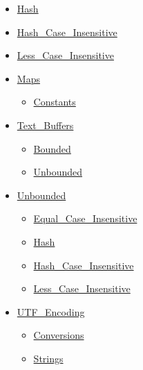 \begin{scriptsize}
\begin{multicols*}{\columnnr}
\begin{itemize}[leftmargin=0mm]
\begin{itemize}[leftmargin=5mm]
\begin{itemize}[leftmargin=5mm]
\begin{itemize}[leftmargin=5mm]
	  \end{itemize}
	\item[] \href{http://www.ada-auth.org/standards/22rm/html/RM-A-4-9.html}{Hash}
	\item[] \href{http://www.ada-auth.org/standards/22rm/html/RM-A-4-9.html}{Hash\_Case\_Insensitive}
	\item[] \href{http://www.ada-auth.org/standards/22rm/html/RM-A-4-10.html}{Less\_Case\_Insensitive}
	\item[] \href{http://www.ada-auth.org/standards/22rm/html/RM-A-4-2.html}{Maps}
	  \begin{itemize}[leftmargin=5mm]
	  \item[] \href{http://www.ada-auth.org/standards/22rm/html/RM-A-4-6.html}{Constants}
	  \end{itemize}
	\item[] \href{http://www.ada-auth.org/standards/22rm/html/RM-A-4-12.html}{Text\_Buffers}
	  \begin{itemize}[leftmargin=5mm]
	  \item[] \href{http://www.ada-auth.org/standards/22rm/html/RM-A-4-12.html}{Bounded}
	  \item[] \href{http://www.ada-auth.org/standards/22rm/html/RM-A-4-12.html}{Unbounded}
	  \end{itemize}
	\item[] \href{http://www.ada-auth.org/standards/22rm/html/RM-A-4-5.html}{Unbounded}
	  \begin{itemize}[leftmargin=5mm]
	  \item[] \href{http://www.ada-auth.org/standards/22rm/html/RM-A-4-10.html}{Equal\_Case\_Insensitive}
	  \item[] \href{http://www.ada-auth.org/standards/22rm/html/RM-A-4-9.html}{Hash}
	  \item[] \href{http://www.ada-auth.org/standards/22rm/html/RM-A-4-9.html}{Hash\_Case\_Insensitive}
	  \item[] \href{http://www.ada-auth.org/standards/22rm/html/RM-A-4-10.html}{Less\_Case\_Insensitive}
	  \end{itemize}
	\item[] \href{http://www.ada-auth.org/standards/22rm/html/RM-A-4-11.html}{UTF\_Encoding}
	  \begin{itemize}[leftmargin=5mm]
	  \item[] \href{http://www.ada-auth.org/standards/22rm/html/RM-A-4-11.html}{Conversions}
	  \item[] \href{http://www.ada-auth.org/standards/22rm/html/RM-A-4-11.html}{Strings}

\end{itemize}
\end{itemize}
\end{itemize}
\end{itemize}
\end{multicols*}
\end{scriptsize}
